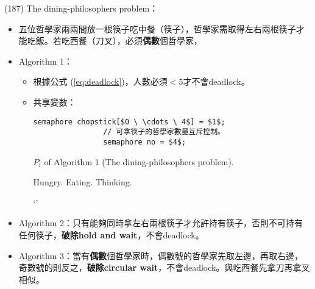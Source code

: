 \begin{theorem}{(187)} The dining-philosophers problem：\begin{itemize}
        \item 五位哲學家兩兩間放一根筷子吃中餐（筷子），哲學家需取得左右兩根筷子才能吃飯。若吃西餐（刀叉），必須\textbf{偶數}個哲學家，
        \item Algorithm 1：\begin{itemize}
            \item 根據公式 (\ref{eq:deadlock})，人數必須$< 5$才不會deadlock。
            \item 共享變數：\begin{lstlisting}[caption={Shared variables of The dining-philosophers problem.}, captionpos=b, mathescape=true]
                semaphore chopstick[$0 \ \cdots \ 4$] = $1$;
                // 可拿筷子的哲學家數量互斥控制。
                semaphore no = $4$; 
            \end{lstlisting}
            \begin{algorithm}[H]
                \caption{$P_i$ of Algorithm 1 (The dining-philosophers problem).}
                \begin{algorithmic}[1]
                        \Repeat
                            \State {}
                            \State Hungry.
                            \State {}
                            \State {}
                            \State Eating.
                            \State {}
                            \State {}
                            \State Thinking.
                            \State {}
                    \EndFunction
                \end{algorithmic}`'
            \end{algorithm}
        \end{itemize}
        \item Algorithm 2：只有能夠同時拿左右兩根筷子才允許持有筷子，否則不可持有任何筷子，\textbf{破除hold and wait}，不會deadlock。
        \item Algorithm 3：當有\textbf{偶數}個哲學家時，偶數號的哲學家先取左邊，再取右邊，奇數號的則反之，\textbf{破除circular wait}，不會deadlock。與吃西餐先拿刀再拿叉相似。
    \end{itemize}
\end{theorem}

